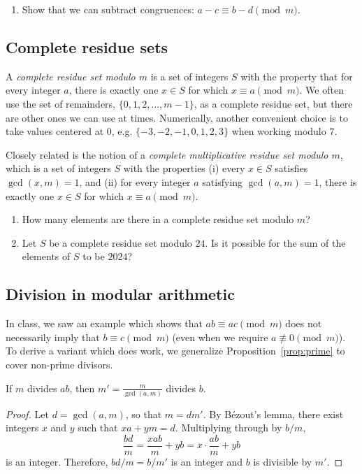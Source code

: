 \begin{enumerate}
\item Show that we can subtract congruences: $a - c\equiv b - d\pmod{m}$.
\end{enumerate}


\subsection{Complete residue sets}

A \emph{complete residue set modulo $m$} is a set of integers $S$ with the property that for every integer $a$, there is exactly one $x\in S$ for which $x\equiv a\pmod{m}$. We often use the set of remainders, $\{0, 1, 2, \ldots, m - 1\}$, as a complete residue set, but there are other ones we can use at times. Numerically, another convenient choice is to take values centered at 0, e.g. $\{-3, -2, -1, 0, 1, 2, 3\}$ when working modulo 7.

Closely related is the notion of a \emph{complete multiplicative residue set modulo $m$}, which is a set of integers $S$ with the properties (i) every $x\in S$ satisfies $\gcd(x,m) = 1$, and (ii) for every integer $a$ satisfying $\gcd(a,m) = 1$, there is exactly one $x\in S$ for which $x\equiv a\pmod{m}$.

\begin{enumerate}
\item How many elements are there in a complete residue set modulo $m$?
\item Let $S$ be a complete residue set modulo $24$. Is it possible for the sum of the elements of $S$ to be $2024$?
\end{enumerate}


\subsection{Division in modular arithmetic}

In class, we saw an example which shows that $ab\equiv ac\pmod{m}$ does not necessarily imply that $b\equiv c\pmod{m}$ (even when we require $a\not\equiv 0\pmod{m}$). To derive a variant which does work, we generalize Proposition~\ref{prop:prime} to cover non-prime divisors.

\begin{lemma}\label{lem:divisibility-product}
If $m$ divides $ab$, then $m' = \frac{m}{\gcd(a,m)}$ divides $b$.
\end{lemma}
\begin{proof}
Let $d = \gcd(a,m)$, so that $m = dm'$. By B\'{e}zout's lemma, there exist integers $x$ and $y$ such that $xa + ym = d$. Multiplying through by $b/m$,
\begin{equation*}
\frac{bd}{m} = \frac{xab}{m} + yb = x\cdot\frac{ab}{m} + yb
\end{equation*}
is an integer. Therefore, $bd/m = b/m'$ is an integer and $b$ is divisible by $m'$.
\end{proof}

